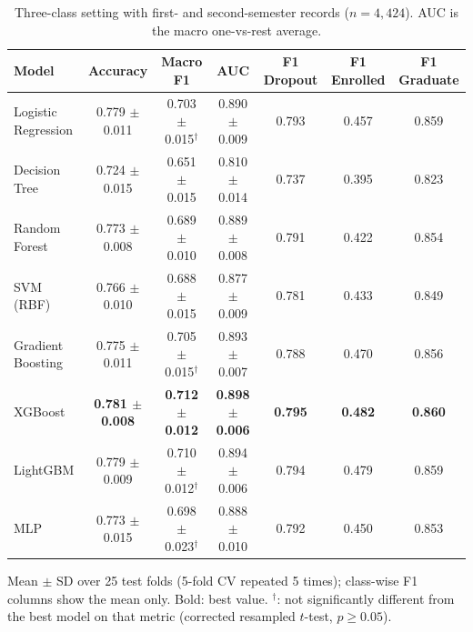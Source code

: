 \begin{table}[H]
\centering
\small
\setlength{\tabcolsep}{3.5pt}
\caption{Three-class setting with first- and second-semester records ($n=4{,}424$). AUC is the macro one-vs-rest average.}
\label{tab:multi}
\begin{tabular}{lcccccc}
\toprule
Model & Accuracy & Macro F1 & AUC & F1 Dropout & F1 Enrolled & F1 Graduate \\
\midrule
Logistic Regression & 0.779 $\pm$ 0.011 & 0.703 $\pm$ 0.015$^{\dagger}$ & 0.890 $\pm$ 0.009 & 0.793 & 0.457 & 0.859 \\
Decision Tree & 0.724 $\pm$ 0.015 & 0.651 $\pm$ 0.015 & 0.810 $\pm$ 0.014 & 0.737 & 0.395 & 0.823 \\
Random Forest & 0.773 $\pm$ 0.008 & 0.689 $\pm$ 0.010 & 0.889 $\pm$ 0.008 & 0.791 & 0.422 & 0.854 \\
SVM (RBF) & 0.766 $\pm$ 0.010 & 0.688 $\pm$ 0.015 & 0.877 $\pm$ 0.009 & 0.781 & 0.433 & 0.849 \\
Gradient Boosting & 0.775 $\pm$ 0.011 & 0.705 $\pm$ 0.015$^{\dagger}$ & 0.893 $\pm$ 0.007 & 0.788 & 0.470 & 0.856 \\
XGBoost & \textbf{0.781 $\pm$ 0.008} & \textbf{0.712 $\pm$ 0.012} & \textbf{0.898 $\pm$ 0.006} & \textbf{0.795} & \textbf{0.482} & \textbf{0.860} \\
LightGBM & 0.779 $\pm$ 0.009 & 0.710 $\pm$ 0.012$^{\dagger}$ & 0.894 $\pm$ 0.006 & 0.794 & 0.479 & 0.859 \\
MLP & 0.773 $\pm$ 0.015 & 0.698 $\pm$ 0.023$^{\dagger}$ & 0.888 $\pm$ 0.010 & 0.792 & 0.450 & 0.853 \\
\bottomrule
\end{tabular}
\par\smallskip\footnotesize Mean $\pm$ SD over 25 test folds (5-fold CV repeated 5 times); class-wise F1 columns show the mean only. Bold: best value. $^{\dagger}$: not significantly different from the best model on that metric (corrected resampled $t$-test, $p\ge 0.05$).
\end{table}
